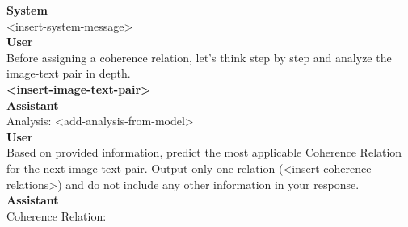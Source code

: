 \begin{figure*}[t]
    \centering
    \begin{tcolorbox}[title={CoT Prompt for DisREL, Tweet Subtitles and CLUE Single-Label}, colframe = red!30, colback = red!10, coltitle = red!20!black, after skip=0pt, boxsep=5pt, width=\textwidth]
    
    \textbf{System} \\
    <insert-system-message> \\
    
    \textbf{User} \\
    Before assigning a coherence relation, let's think step by step and analyze the image-text pair in depth. \\
        
    \textbf{<insert-image-text-pair>} \\
    
    \textbf{Assistant} \\
    Analysis: <add-analysis-from-model> \\

    \textbf{User} \\
    Based on provided information, predict the most applicable Coherence Relation for the next image-text pair. Output only one relation (<insert-coherence-relations>) and do not include any other information in your response. \\

    \textbf{Assistant} \\
    Coherence Relation:
    
    \end{tcolorbox}
\end{figure*}


